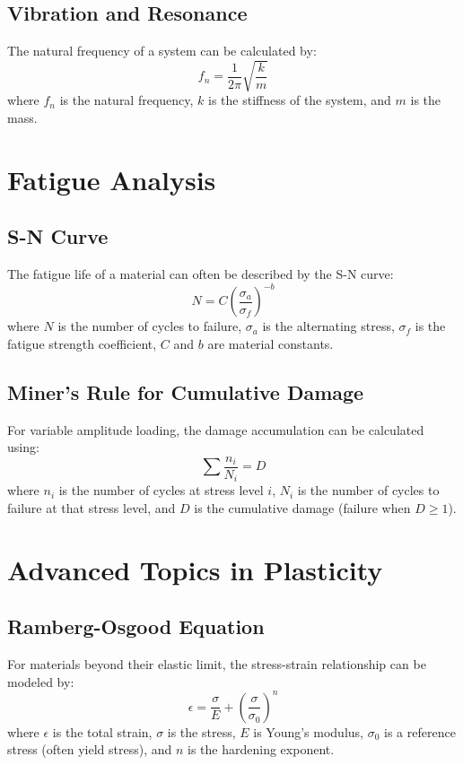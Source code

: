 \documentclass[12pt]{article}
\begin{document}
\subsection{Vibration and Resonance}
The natural frequency of a system can be calculated by:
\begin{equation}
f_n = \frac{1}{2\pi} \sqrt{\frac{k}{m}}
\end{equation}
where $f_n$ is the natural frequency, $k$ is the stiffness of the system, and $m$ is the mass.

\section{Fatigue Analysis}

\subsection{S-N Curve}
The fatigue life of a material can often be described by the S-N curve:
\begin{equation}
N = C \left( \frac{\sigma_a}{\sigma_f} \right)^{-b}
\end{equation}
where $N$ is the number of cycles to failure, $\sigma_a$ is the alternating stress, $\sigma_f$ is the fatigue strength coefficient, $C$ and $b$ are material constants.

\subsection{Miner's Rule for Cumulative Damage}
For variable amplitude loading, the damage accumulation can be calculated using:
\begin{equation}
\sum \frac{n_i}{N_i} = D
\end{equation}
where $n_i$ is the number of cycles at stress level $i$, $N_i$ is the number of cycles to failure at that stress level, and $D$ is the cumulative damage (failure when $D \geq 1$).

\section{Advanced Topics in Plasticity}

\subsection{Ramberg-Osgood Equation}
For materials beyond their elastic limit, the stress-strain relationship can be modeled by:
\begin{equation}
\epsilon = \frac{\sigma}{E} + \left( \frac{\sigma}{\sigma_0} \right)^n
\end{equation}
where $\epsilon$ is the total strain, $\sigma$ is the stress, $E$ is Young's modulus, $\sigma_0$ is a reference stress (often yield stress), and $n$ is the hardening exponent.
\end{document}
